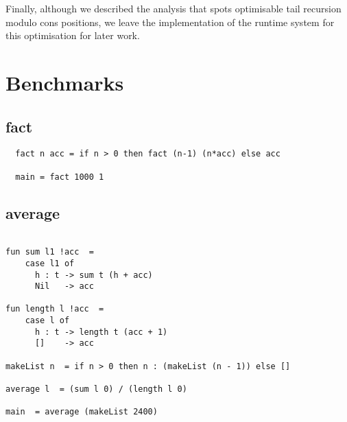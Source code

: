 \documentclass[diploma]{softlab-thesis}
\begin{document}
Finally, although we described the analysis that spots optimisable 
tail recursion modulo cons positions, we leave the implementation of the 
runtime system for this optimisation for later work.










\backmatter

\appendix

\chapter{Benchmarks}
\label{appendix:bench}

\section{fact}

\begin{verbatim}
  fact n acc = if n > 0 then fact (n-1) (n*acc) else acc

  main = fact 1000 1
\end{verbatim}

\section{average}

\begin{verbatim}

fun sum l1 !acc  =
    case l1 of 
      h : t -> sum t (h + acc)
      Nil   -> acc

fun length l !acc  =
    case l of 
      h : t -> length t (acc + 1)
      []    -> acc

makeList n  = if n > 0 then n : (makeList (n - 1)) else []

average l  = (sum l 0) / (length l 0)

main  = average (makeList 2400)
\end{verbatim}
\end{document}
